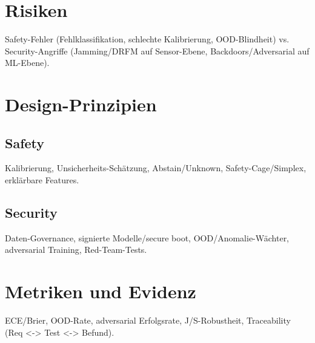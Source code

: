 \section{Risiken}
Safety-Fehler (Fehlklassifikation, schlechte Kalibrierung, OOD-Blindheit) 
vs. Security-Angriffe (Jamming/DRFM auf Sensor-Ebene, Backdoors/Adversarial auf ML-Ebene).

\section{Design-Prinzipien}
\subsection{Safety}
Kalibrierung, Unsicherheits-Schätzung, Abstain/Unknown, Safety-Cage/Simplex, erklärbare Features.

\subsection{Security}
Daten-Governance, signierte Modelle/secure boot, OOD/Anomalie-Wächter, adversarial Training, Red-Team-Tests.

\section{Metriken und Evidenz}
ECE/Brier, OOD-Rate, adversarial Erfolgsrate, J/S-Robustheit, Traceability (Req <-> Test <-> Befund).











